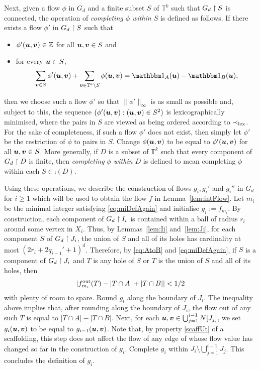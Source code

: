\documentclass[12pt,a4paper]{amsart}
\numberwithin{equation}{section}
\theoremstyle{definition}
\begin{document}
Next, given a flow $\phi$ in $G_d$ and a finite subset $S$ of $\mathbb{T}^k$ such that $G_d\upharpoonright S$ is connected, the operation of \emph{completing $\phi$ within $S$} is defined as follows. If there exists a flow $\phi'$ in $G_d\upharpoonright S$ such that
\begin{itemize}
\item $\phi'(\boldsymbol{u},\boldsymbol{v})\in \mathbb{Z}$ for all $\boldsymbol{u},\boldsymbol{v}\in S$ and
\item for every $\boldsymbol{u}\in S$, 
\[\sum_{\vvec{v}\in S}\phi'(\vvec{u},\vvec{v}) + \sum_{\vvec{v}\in\mathbb{T}^k\setminus S}\phi(\vvec{u},\vvec{v}) = \ind_A(\vvec{u})-\ind_B(\vvec{u}),\]
\end{itemize}
then we choose such a flow $\phi'$ so that $\|\phi'\|_\infty$ is as small as possible and, subject to this, the sequence $(\phi'(\boldsymbol{u},\boldsymbol{v}): (\boldsymbol{u},\boldsymbol{v})\in S^2)$ is lexicographically minimised, where the pairs in $S$ are viewed as being ordered according to $\prec_{\operatorname{lex}}$. For the sake of completeness, if such a flow $\phi'$ does not exist, then simply let $\phi'$ be the restriction of $\phi$ to pairs in $S$. Change $\phi(\boldsymbol{u},\boldsymbol{v})$ to be equal to $\phi'(\boldsymbol{u},\boldsymbol{v})$ for all $\boldsymbol{u},\boldsymbol{v}\in S$. More generally, if $D$ is a subset of $\mathbb{T}^k$ such that every component of $G_d\upharpoonright D$ is finite, then \emph{completing $\phi$ within $D$} is defined to mean completing $\phi$ within each $S\in\comp(D)$.  

Using these operations, we describe the construction of flows $g_i,g_i'$ and $g_i''$ in $G_d$ for $i\geq1$ which will be used to obtain the flow $f$ in Lemma~\ref{lem:intFlow}. Let $m_i$ be the minimal integer satisfying \eqref{eq:miDefAgain} and initialise $g_i:=f_{m_i}$. By construction, each component of $G_d\upharpoonright I_i$ is contained within a ball of radius $r_i$ around some vertex in $X_i$. Thus, by Lemmas~\ref{lem:Ii} and~\ref{lem:Ji}, for each component $S$ of $G_d\upharpoonright J_i$, the union of $S$ and all of its holes has cardinality at most $(2r_i+2q_{i-1}'+1)^d$. Therefore, by \eqref{eq:AtoB} and \eqref{eq:miDefAgain}, if $S$ is a component of $G_d\upharpoonright J_i$ and $T$ is any hole of $S$ or $T$ is the union of $S$ and all of its holes, then 
\[|f_{m_i}^{\operatorname{out}}(T) - |T\cap A|+|T\cap B||<1/2\]
with plenty of room to spare. Round $g_i$ along the boundary of $J_i$. The inequality above implies that, after rounding along the boundary of $J_i$, the flow out of any such $T$ is equal to $|T\cap A|-|T\cap B|$. Next, for each $\boldsymbol{u},\boldsymbol{v}\in \bigcup_{j=1}^{i-1}N[J_j]$, we set $g_i(\boldsymbol{u},\boldsymbol{v})$ to be equal to $g_{i-1}(\boldsymbol{u},\boldsymbol{v})$. Note that, by property \eqref{scaffUt} of a scaffolding, this step does not affect the flow of any edge of whose flow value has changed so far in the construction of $g_i$. Complete $g_i$ within $J_i\setminus \bigcup_{j=1}^{i-1}J_j$. This concludes the definition of $g_i$. 
\end{document}
